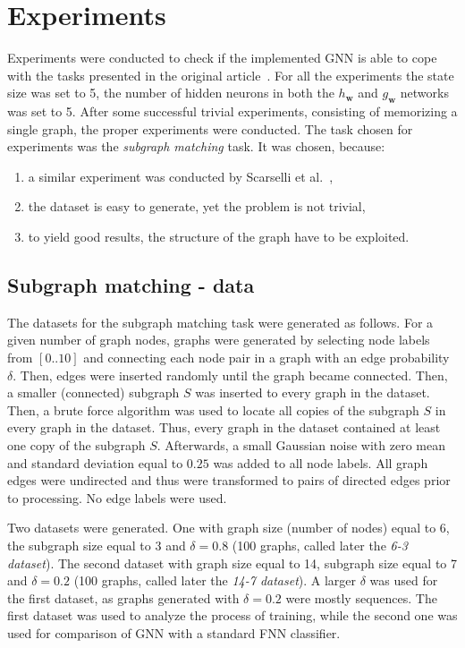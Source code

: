 
\chapter{Experiments~\label{ch:experiments}}
Experiments were conducted to check if the implemented GNN is able to cope with the tasks presented in the original article~\cite{scarselli2009graph}. For all the experiments the state size was set to 5, the number of hidden neurons in both the $h_{\bm{w}}$ and $g_{\bm{w}}$ networks was set to 5. After some successful trivial experiments, consisting of memorizing a single graph, the proper experiments were conducted. The task chosen for experiments was the \emph{subgraph matching} task. It was chosen, because:
\begin{enumerate}
	\item a similar experiment was conducted by Scarselli et al.~\cite{scarselli2009graph},
	\item the dataset is easy to generate, yet the problem is not trivial,
	\item to yield good results, the structure of the graph have to be exploited.
\end{enumerate}

\section{Subgraph matching - data}
The datasets for the subgraph matching task were generated as follows. For a given number of graph nodes, graphs were generated by selecting node labels from $[0..10]$ and connecting each node pair in a graph with an edge probability $\delta$. Then, edges were inserted randomly until the graph became connected. Then, a smaller (connected) subgraph $S$ was inserted to every graph in the dataset. Then, a brute force algorithm was used to locate all copies of the subgraph $S$ in every graph in the dataset. Thus, every graph in the dataset contained at least one copy of the subgraph $S$. Afterwards, a small Gaussian noise with zero mean and standard deviation equal to $0.25$ was added to all node labels. All graph edges were undirected and thus were transformed to pairs of directed edges prior to processing. No edge labels were used.

Two datasets were generated. One with graph size (number of nodes) equal to 6, the subgraph size equal to 3 and $\delta = 0.8$ (100 graphs, called later the \emph{6-3 dataset}). The second dataset with graph size equal to 14, subgraph size equal to 7 and $\delta = 0.2$ (100 graphs, called later the \emph{14-7 dataset}). A larger $\delta$ was used for the first dataset, as graphs generated with $\delta = 0.2$ were mostly sequences. The first dataset was used to analyze the process of training, while the second one was used for comparison of GNN with a standard FNN classifier.

